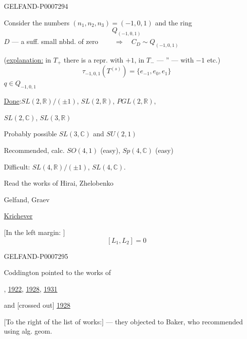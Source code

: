 \begin{GelfandAdjacentEvidence}{GELFAND-P000729}{4}


Consider the numbers \((n_1,n_2,n_3)=(-1,0,1)\) and the ring
\[
Q_{(-1,0,1)}
\]
\(D\) --- a suff. small nbhd. of zero \(\qquad\Rightarrow\quad C_D\sim Q_{(-1,0,1)}\)

(\underline{explanation:} in \(T_+\) there is a repr. with \(+1\), in \(T_-\) --- '' --- with \(-1\) etc.)
\[
\tau_{-1,0,1}(T^{(s)})=\{e_{-1},e_0,e_1\}
\]
\(q\in Q_{-1,0,1}\)

\par\smallskip\noindent\dotfill\par\smallskip

\underline{Done}:\quad \(SL(2,\mathbb R)/(\pm1)\), \(SL(2,\mathbb R)\), \(PGL(2,\mathbb R)\),

\(SL(2,\mathbb C)\), \(SL(3,\mathbb R)\)

Probably possible \(SL(3,\mathbb C)\) and \(SU(2,1)\)

Recommended, calc. \(SO(4,1)\) (easy), \(Sp(4,\mathbb C)\) (easy)

Difficult: \(SL(4,\mathbb R)/(\pm1)\), \(SL(4,\mathbb C)\).

Read the works of Hirai, Zhelobenko

Gelfand, Graev

\underline{Krichever}


[In the left margin: ]
\[
[L_1,L_2]=0
\]
\end{GelfandAdjacentEvidence}
\begin{GelfandAdjacentEvidence}{GELFAND-P000729}{5}


Coddington pointed to the works of

, \quad
\href{https://doi.org/10.1112/plms/s2-21.1.420}{1922},
\href{https://doi.org/10.1098/rspa.1928.0069}{1928},
\href{https://doi.org/10.1098/rspa.1931.0208}{1931}

and  [crossed out] \href{https://doi.org/10.1098/rspa.1928.0070}{1928}
\end{GelfandAdjacentEvidence}


[To the right of the list of works:] --- they objected to Baker, who recommended using alg. geom.

